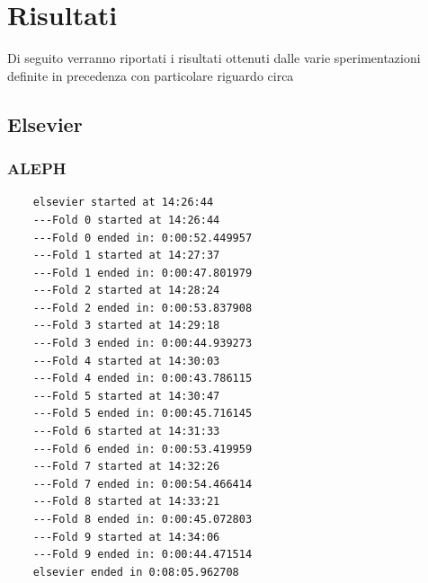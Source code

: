 \section{Risultati}
Di seguito verranno riportati i risultati ottenuti dalle varie sperimentazioni definite in precedenza con particolare riguardo circa 
\subsection{Elsevier}
\subsubsection{ALEPH}

\begin{verbatim}
	elsevier started at 14:26:44
	---Fold 0 started at 14:26:44
	---Fold 0 ended in: 0:00:52.449957
	---Fold 1 started at 14:27:37
	---Fold 1 ended in: 0:00:47.801979
	---Fold 2 started at 14:28:24
	---Fold 2 ended in: 0:00:53.837908
	---Fold 3 started at 14:29:18
	---Fold 3 ended in: 0:00:44.939273
	---Fold 4 started at 14:30:03
	---Fold 4 ended in: 0:00:43.786115
	---Fold 5 started at 14:30:47
	---Fold 5 ended in: 0:00:45.716145
	---Fold 6 started at 14:31:33
	---Fold 6 ended in: 0:00:53.419959
	---Fold 7 started at 14:32:26
	---Fold 7 ended in: 0:00:54.466414
	---Fold 8 started at 14:33:21
	---Fold 8 ended in: 0:00:45.072803
	---Fold 9 started at 14:34:06
	---Fold 9 ended in: 0:00:44.471514
	elsevier ended in 0:08:05.962708
\end{verbatim}

